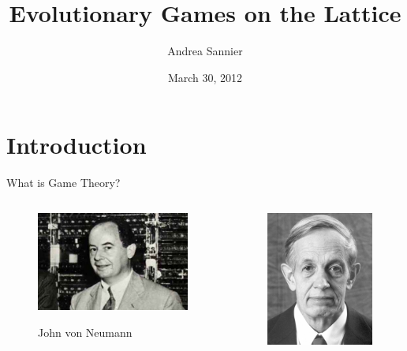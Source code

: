 \documentclass{beamer}
\title{Evolutionary Games on the Lattice}
\author{Andrea Sannier}
\date{March 30, 2012}
\begin{document}
\begin{frame}
\titlepage
\end{frame}

\section{Introduction}
\begin{frame}[c]{What is Game Theory?}
\begin{columns}[c]
  \begin{column}{.5\textwidth}
    \begin{figure}  
      \includegraphics[width=\textwidth]{./images/vonNeumann.jpg}

      \small{John von Neumann}
    \end{figure}
  \end{column}
  \begin{column}{.5\textwidth}
    \begin{figure}
      \includegraphics[width=.7\textwidth]{./images/nash.jpg}


\end{figure}
\end{column}
\end{columns}
\end{frame}
\end{document}
